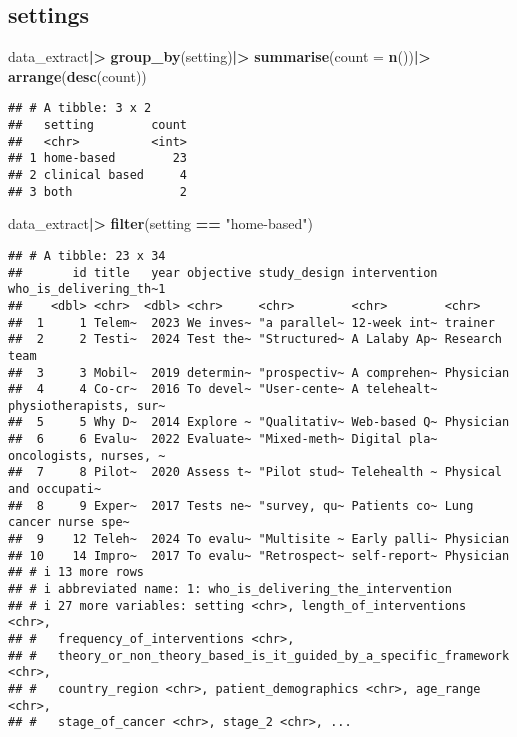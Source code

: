 \documentclass[
]{article}
\newenvironment{Shaded}{\begin{snugshade}}{\end{snugshade}}
\newcommand{\AttributeTok}[1]{\textcolor[rgb]{0.13,0.29,0.53}{#1}}
\newcommand{\FunctionTok}[1]{\textcolor[rgb]{0.13,0.29,0.53}{\textbf{#1}}}
\newcommand{\NormalTok}[1]{#1}
\newcommand{\SpecialCharTok}[1]{\textcolor[rgb]{0.81,0.36,0.00}{\textbf{#1}}}
\newcommand{\StringTok}[1]{\textcolor[rgb]{0.31,0.60,0.02}{#1}}
\begin{document}
\subsection{settings}\label{settings}

\begin{Shaded}
\begin{Highlighting}[]
\NormalTok{data\_extract}\SpecialCharTok{|\textgreater{}}
  \FunctionTok{group\_by}\NormalTok{(setting)}\SpecialCharTok{|\textgreater{}}
  \FunctionTok{summarise}\NormalTok{(}\AttributeTok{count =} \FunctionTok{n}\NormalTok{())}\SpecialCharTok{|\textgreater{}}
  \FunctionTok{arrange}\NormalTok{(}\FunctionTok{desc}\NormalTok{(count))}
\end{Highlighting}
\end{Shaded}

\begin{verbatim}
## # A tibble: 3 x 2
##   setting        count
##   <chr>          <int>
## 1 home-based        23
## 2 clinical based     4
## 3 both               2
\end{verbatim}

\begin{Shaded}
\begin{Highlighting}[]
\NormalTok{data\_extract}\SpecialCharTok{|\textgreater{}}
  \FunctionTok{filter}\NormalTok{(setting }\SpecialCharTok{==} \StringTok{"home{-}based"}\NormalTok{)}
\end{Highlighting}
\end{Shaded}

\begin{verbatim}
## # A tibble: 23 x 34
##       id title   year objective study_design intervention who_is_delivering_th~1
##    <dbl> <chr>  <dbl> <chr>     <chr>        <chr>        <chr>                 
##  1     1 Telem~  2023 We inves~ "a parallel~ 12-week int~ trainer               
##  2     2 Testi~  2024 Test the~ "Structured~ A Lalaby Ap~ Research team         
##  3     3 Mobil~  2019 determin~ "prospectiv~ A comprehen~ Physician             
##  4     4 Co-cr~  2016 To devel~ "User-cente~ A telehealt~ physiotherapists, sur~
##  5     5 Why D~  2014 Explore ~ "Qualitativ~ Web-based Q~ Physician             
##  6     6 Evalu~  2022 Evaluate~ "Mixed-meth~ Digital pla~ oncologists, nurses, ~
##  7     8 Pilot~  2020 Assess t~ "Pilot stud~ Telehealth ~ Physical and occupati~
##  8     9 Exper~  2017 Tests ne~ "survey, qu~ Patients co~ Lung cancer nurse spe~
##  9    12 Teleh~  2024 To evalu~ "Multisite ~ Early palli~ Physician             
## 10    14 Impro~  2017 To evalu~ "Retrospect~ self-report~ Physician             
## # i 13 more rows
## # i abbreviated name: 1: who_is_delivering_the_intervention
## # i 27 more variables: setting <chr>, length_of_interventions <chr>,
## #   frequency_of_interventions <chr>,
## #   theory_or_non_theory_based_is_it_guided_by_a_specific_framework <chr>,
## #   country_region <chr>, patient_demographics <chr>, age_range <chr>,
## #   stage_of_cancer <chr>, stage_2 <chr>, ...
\end{verbatim}
\end{document}
